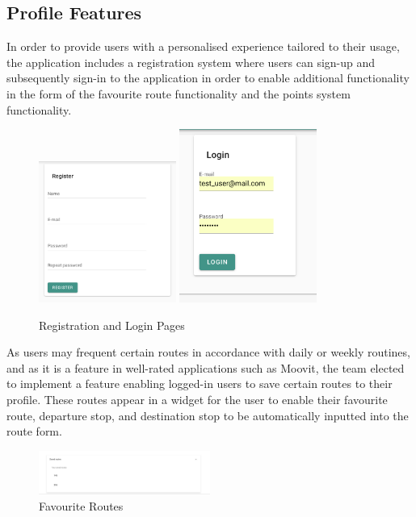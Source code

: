 \documentclass[]{UCD_CS_47360_Report}
\begin{document}
\subsection{Profile Features}
In order to provide users with a personalised experience tailored to their usage, the application includes a registration system where users can sign-up and subsequently sign-in to the application in order to enable additional functionality in the form of the favourite route functionality and the points system functionality.
\begin{figure}[!htb]
    \centering
    \includegraphics[width=0.4\textwidth]{figures/2_4_Register.png}
    \includegraphics[width=0.4\textwidth]{figures/2_4_Login.png}
    \caption{Registration and Login Pages}
    \label{fig:Registration}
\end{figure}
As users may frequent certain routes in accordance with daily or weekly routines, and as it is a feature in well-rated applications such as Moovit, the team elected to implement a feature enabling logged-in users to save certain routes to their profile. These routes appear in a widget for the user to enable their favourite route, departure stop, and destination stop to be automatically inputted into the route form.
\begin{figure}[!htb]
    \centering
    \includegraphics[width=0.5\textwidth]{figures/2_4_Saved_Routes.png}
    \caption{Favourite Routes}
    \label{fig:Registration}
\end{figure}
\end{document}

